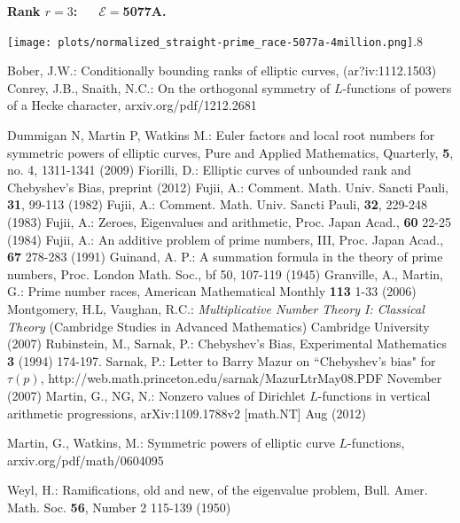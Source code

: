 \documentclass[11pt]{article}
\theoremstyle{plain}
\theoremstyle{definition}
\numberwithin{equation}{section}
\numberwithin{figure}{section}
\numberwithin{table}{section}
\begin{document}
   \vskip60pt


  \centerline{\bf Rank $r=3$:\ \ \  ${\mathcal E}=$5077A.}




     \texttt{[image: plots/normalized\_straight-prime\_race-5077a-4million.png]}{.8}~\label{nr389}







\begin{thebibliography}{bib}
 \label{B} Bober, J.W.: Conditionally bounding ranks of elliptic curves, (ar?iv:1112.1503)
 \label{C-S} Conrey, J.B., Snaith, N.C.:  On the orthogonal symmetry of $L$-functions of powers of a Hecke character, arxiv.org/pdf/1212.2681


 \label{DMW} Dummigan N, Martin P, Watkins M.: Euler factors and local root numbers for symmetric powers of elliptic curves, Pure and Applied Mathematics, Quarterly, {\bf 5},  no. 4, 1311-1341  (2009)
  \label{F}  Fiorilli, D.: Elliptic curves of unbounded rank and Chebyshev's Bias, preprint (2012)
        \label{Fu1} Fujii, A.:  Comment. Math. Univ. Sancti Pauli, {\bf 31}, 99-113 (1982)
        \label{Fu2} Fujii, A.:  Comment. Math. Univ. Sancti Pauli, {\bf 32}, 229-248 (1983)
      \label{Fu3} Fujii, A.: Zeroes, Eigenvalues and arithmetic, Proc. Japan Acad., {\bf 60} 22-25 (1984)
    \label{Fu4} Fujii, A.: An additive problem of prime numbers, III, Proc. Japan Acad., {\bf 67} 278-283 (1991)
   \label{G} Guinand, A. P.: A summation formula in the theory of prime numbers, Proc. London Math. Soc., {bf 50}, 107-119 (1945)
 \label{GM}  Granville, A., Martin, G.:  Prime number races,
American Mathematical Monthly {\bf 113} 1-33 (2006)
  \label{MV} Montgomery, H.L, Vaughan, R.C.:   {\it Multiplicative Number Theory I: Classical Theory} (Cambridge Studies in Advanced Mathematics) Cambridge University (2007)
  \label{R-S}   Rubinstein, M., Sarnak, P.: Chebyshev's Bias,  Experimental  Mathematics {\bf 3}  (1994) 174-197.
    \label{S} Sarnak, P.: Letter to Barry Mazur on ``Chebyshev's bias" for $\tau(p)$, http://web.math.princeton.edu/sarnak/MazurLtrMay08.PDF  November (2007)
  \label{M-N} Martin, G., NG, N.: Nonzero values of Dirichlet $L$-functions in vertical arithmetic progressions,
    arXiv:1109.1788v2 [math.NT]  Aug (2012)

        \label{M-W} Martin, G., Watkins, M.:  Symmetric powers of elliptic curve $L$-functions, arxiv.org/pdf/math/0604095

     \label{W}  Weyl, H.:  Ramifications, old and new, of the eigenvalue problem,  Bull. Amer. Math. Soc. {\bf 56}, Number 2 115-139 (1950)
\end{thebibliography}



\end{document}
